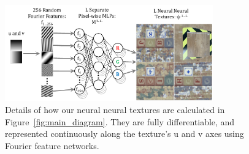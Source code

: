 \documentclass{article}
\begin{document}
		
		\begin{figure}[t]
		    \vspace{-5pt}
			\begin{center}
				\includegraphics[width=0.8\textwidth]{../images/learnable_textures.pdf}
			\end{center}
			\vspace{-3pt}
			\caption{
				Details of how our neural neural textures are calculated in Figure~\ref{fig:main_diagram}. They are fully differentiable, and represented continuously along the texture's u and v axes using Fourier feature networks.
			}
			\vspace{-3pt}
			\label{fig:learnable_textures}
		\end{figure}


		
				
\end{document}
